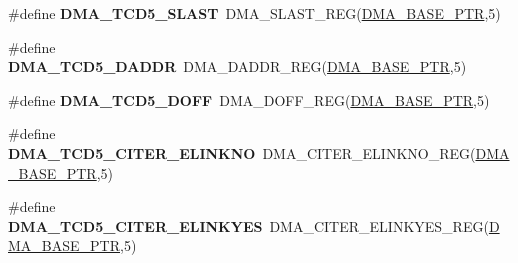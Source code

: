 \begin{DoxyCompactItemize}
\item 
\hypertarget{group___d_m_a___register___accessor___macros_ga6300280a7a20a56a96584820c6942421}{}\#define {\bfseries D\+M\+A\+\_\+\+T\+C\+D5\+\_\+\+S\+L\+A\+S\+T}~D\+M\+A\+\_\+\+S\+L\+A\+S\+T\+\_\+\+R\+E\+G(\hyperlink{group___d_m_a___peripheral_ga6997fbc1b1973e9f27170217a3bd6f22}{D\+M\+A\+\_\+\+B\+A\+S\+E\+\_\+\+P\+T\+R},5)\label{group___d_m_a___register___accessor___macros_ga6300280a7a20a56a96584820c6942421}

\item 
\hypertarget{group___d_m_a___register___accessor___macros_gaf9396476f6de4566cf2caef66b2e6b56}{}\#define {\bfseries D\+M\+A\+\_\+\+T\+C\+D5\+\_\+\+D\+A\+D\+D\+R}~D\+M\+A\+\_\+\+D\+A\+D\+D\+R\+\_\+\+R\+E\+G(\hyperlink{group___d_m_a___peripheral_ga6997fbc1b1973e9f27170217a3bd6f22}{D\+M\+A\+\_\+\+B\+A\+S\+E\+\_\+\+P\+T\+R},5)\label{group___d_m_a___register___accessor___macros_gaf9396476f6de4566cf2caef66b2e6b56}

\item 
\hypertarget{group___d_m_a___register___accessor___macros_gaed65b973d5ac8e9dbb0bf825058f6b80}{}\#define {\bfseries D\+M\+A\+\_\+\+T\+C\+D5\+\_\+\+D\+O\+F\+F}~D\+M\+A\+\_\+\+D\+O\+F\+F\+\_\+\+R\+E\+G(\hyperlink{group___d_m_a___peripheral_ga6997fbc1b1973e9f27170217a3bd6f22}{D\+M\+A\+\_\+\+B\+A\+S\+E\+\_\+\+P\+T\+R},5)\label{group___d_m_a___register___accessor___macros_gaed65b973d5ac8e9dbb0bf825058f6b80}

\item 
\hypertarget{group___d_m_a___register___accessor___macros_ga5ba7709b2c12b5d611c4bd4fe9b6a7f9}{}\#define {\bfseries D\+M\+A\+\_\+\+T\+C\+D5\+\_\+\+C\+I\+T\+E\+R\+\_\+\+E\+L\+I\+N\+K\+N\+O}~D\+M\+A\+\_\+\+C\+I\+T\+E\+R\+\_\+\+E\+L\+I\+N\+K\+N\+O\+\_\+\+R\+E\+G(\hyperlink{group___d_m_a___peripheral_ga6997fbc1b1973e9f27170217a3bd6f22}{D\+M\+A\+\_\+\+B\+A\+S\+E\+\_\+\+P\+T\+R},5)\label{group___d_m_a___register___accessor___macros_ga5ba7709b2c12b5d611c4bd4fe9b6a7f9}

\item 
\hypertarget{group___d_m_a___register___accessor___macros_ga893ee9571766a4deef0040cc52f0f353}{}\#define {\bfseries D\+M\+A\+\_\+\+T\+C\+D5\+\_\+\+C\+I\+T\+E\+R\+\_\+\+E\+L\+I\+N\+K\+Y\+E\+S}~D\+M\+A\+\_\+\+C\+I\+T\+E\+R\+\_\+\+E\+L\+I\+N\+K\+Y\+E\+S\+\_\+\+R\+E\+G(\hyperlink{group___d_m_a___peripheral_ga6997fbc1b1973e9f27170217a3bd6f22}{D\+M\+A\+\_\+\+B\+A\+S\+E\+\_\+\+P\+T\+R},5)\label{group___d_m_a___register___accessor___macros_ga893ee9571766a4deef0040cc52f0f353}


\end{DoxyCompactItemize}
